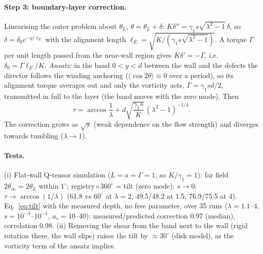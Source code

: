 \paragraph{Step 3: boundary-layer correction.} Linearising the outer problem about $\theta_L$, $\theta=\theta_L+\delta$:
$K\delta''=\gamma_1 s\sqrt{\lambda^2-1}\,\delta$, so $\delta=\delta_0e^{-y/\ell_E}$ with the alignment length $\ell_E=\sqrt{K/(\gamma_1 s\sqrt{\lambda^2-1})}$. A torque $\Gamma$ per
unit length passed from the near-wall region gives $K\delta'=-\Gamma$, i.e.\ $\delta_0=\Gamma\ell_E/K$. \emph{Ansatz:} in the band $0<y<d$ between the wall and the defects the
director follows the winding anchoring ($\langle\cos2\theta\rangle\approx0$ over a period), so its alignment torque averages out and only the vorticity acts,
$\Gamma=\gamma_1 sd/2$, transmitted in full to the layer (the band moves with the zero mode). Then
\begin{equation}
\tau=\arccos\frac1\lambda+d\sqrt{\frac{\gamma_1 s}{K}}\,(\lambda^2-1)^{-1/4}.\label{eq:tilt}
\end{equation}
The correction grows as $\sqrt s$ (weak dependence on the flow strength) and diverges towards tumbling ($\lambda\to1$).
\paragraph{Tests.} (i) Flat-wall Q-tensor simulation ($L=a=\Gamma=1$, so $K/\gamma_1=1$): far field $2\theta_\infty=2\theta_L$ within $1^\circ$;
registry$\times360^\circ$ = tilt (zero mode); $s\to0$: $\tau\to\arccos(1/\lambda)$ (61.8 vs $60^\circ$ at $\lambda=2$, 49.5/48.2 at 1.5, 76.9/75.5 at 4). Eq.~\eqref{eq:tilt} with the
measured depth, no free parameter, over 35 runs ($\lambda=1.1$--4, $s=10^{-3}$--$10^{-1}$, $a_s=10$--40): measured/predicted correction 0.97 (median), correlation 0.98.
(ii) Removing the shear from the band next to the wall (rigid rotation there, the wall slips) raises the tilt by $\approx30^\circ$ (disk model), as the vorticity term of the ansatz implies.
